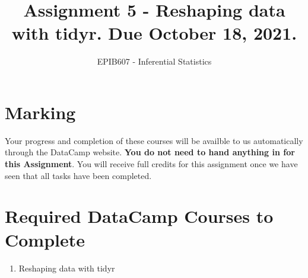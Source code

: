 \documentclass[letterpaper,12pt,twoside,]{pinp}
\title{Assignment 5 - Reshaping data with tidyr. Due October 18, 2021.}
\author[a]{EPIB607 - Inferential Statistics}
\affil[a]{Fall 2021, McGill University}
\providecommand{\tightlist}{%
  \setlength{\itemsep}{0pt}\setlength{\parskip}{0pt}}
\begin{document}
\verticaladjustment{-2pt}

\maketitle
\thispagestyle{firststyle}



\tableofcontents

\vspace*{1in}

\hypertarget{marking}{%
\section{Marking}\label{marking}}

Your progress and completion of these courses will be availble to us
automatically through the DataCamp website. \textbf{You do not need to
hand anything in for this Assignment}. You will receive full credits for
this assignment once we have seen that all tasks have been completed.

\hypertarget{required-datacamp-courses-to-complete}{%
\section{Required DataCamp Courses to
Complete}\label{required-datacamp-courses-to-complete}}

\begin{enumerate}
\def\labelenumi{\arabic{enumi}.}
\tightlist
\item
  Reshaping data with tidyr
\end{enumerate}

\end{document}
